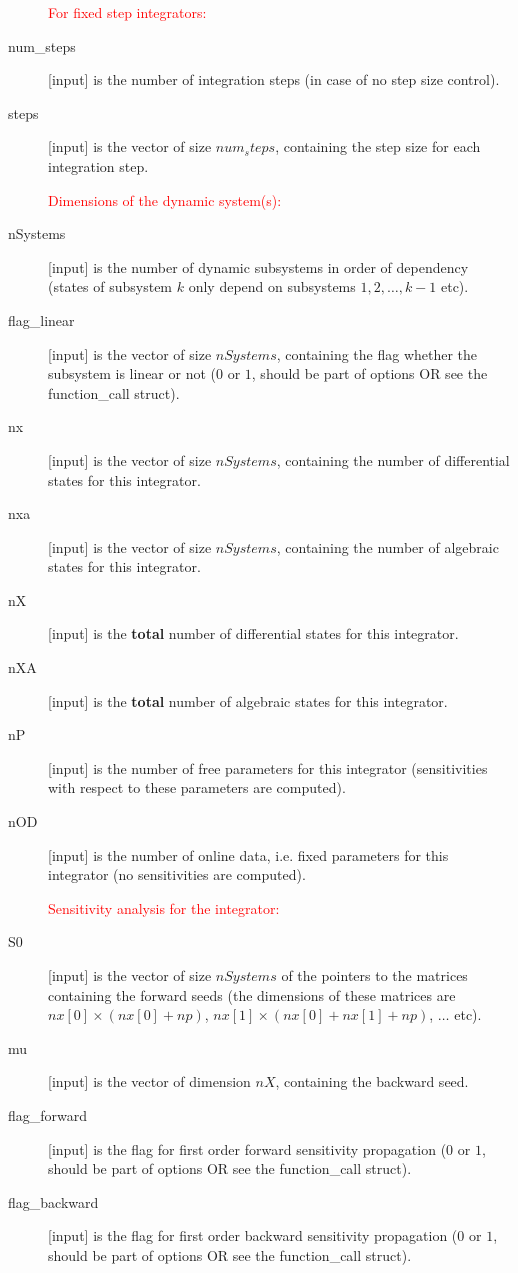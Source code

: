 \documentclass{report}
\begin{document}
\begin{description}
\item[] \textcolor{red}{For fixed step integrators:}
\item[num_steps] [input] is the number of integration steps (in case of no step size control).
\item[steps] [input] is the vector of size $num_steps$, containing the step size for each integration step.
\item[] \textcolor{red}{Dimensions of the dynamic system(s):}
\item[nSystems] [input] is the number of dynamic subsystems in order of dependency (states of subsystem $k$ only depend on subsystems $1,2,\ldots, k-1$ etc).
\item[flag\_linear] [input] is the vector of size $nSystems$, containing the flag whether the subsystem is linear or not ($0$ or $1$, should be part of options OR see the function\_call struct).
\item[nx] [input] is the vector of size $nSystems$, containing the number of differential states for this integrator.
\item[nxa] [input] is the vector of size $nSystems$, containing the number of algebraic states for this integrator.
\item[nX] [input] is the {\bf total} number of differential states for this integrator.
\item[nXA] [input] is the {\bf total} number of algebraic states for this integrator.
\item[nP] [input] is the number of free parameters for this integrator (sensitivities with respect to these parameters are computed).
\item[nOD] [input] is the number of online data, i.e. fixed parameters for this integrator (no sensitivities are computed).
\item[] \textcolor{red}{Sensitivity analysis for the integrator:}
\item[S0] [input] is the vector of size $nSystems$ of the pointers to the matrices containing the forward seeds (the dimensions of these matrices are $nx[0] \times (nx[0]+np)$, $nx[1] \times (nx[0]+nx[1]+np)$, $\ldots$ etc).
\item[mu] [input] is the vector of dimension $nX$, containing the backward seed.
\item[flag\_forward] [input] is the flag for first order forward sensitivity propagation ($0$ or $1$, should be part of options OR see the function\_call struct).
\item[flag\_backward] [input] is the flag for first order backward sensitivity propagation ($0$ or $1$, should be part of options OR see the function\_call struct).

\end{description}
\end{document}
